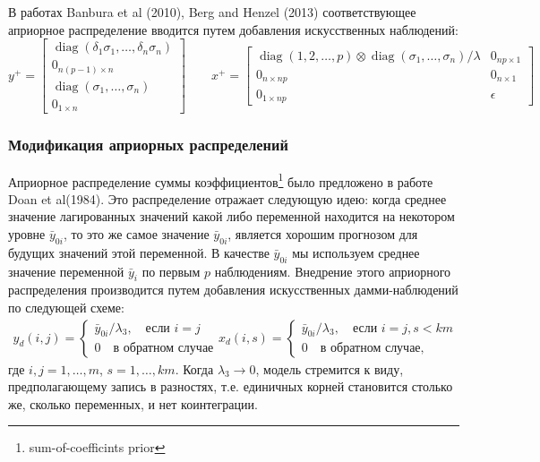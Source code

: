 \documentclass[11pt]{article} %
\DeclareMathOperator{\diag}{diag}
\begin{document}
В работах Banbura et al (2010), Berg and Henzel (2013) соответствующее априорное распределение вводится путем добавления искусственных наблюдений:
\begin{equation}
y^{+}=\begin{bmatrix}
\diag(\delta_1\sigma_1,\ldots, \delta_n\sigma_n)\\
0_{n(p-1)\times n}\\
\diag(\sigma_1,\ldots,\sigma_n)\\
0_{1\times n}
\end{bmatrix}
\qquad
%
x^{+}=\begin{bmatrix}
\diag(1,2,\ldots, p)\otimes \diag(\sigma_1,\ldots,\sigma_n)/\lambda & 0_{np\times 1} \\
0_{n\times np}&0_{n\times 1}\\
0_{1\times np}&\epsilon
\end{bmatrix}
\end{equation}


\subsubsection*{Модификация априорных распределений}

Априорное распределение суммы коэффициентов\footnote{sum-of-coefficints prior} было предложено в работе Doan et al(1984). Это распределение отражает следующую идею:
когда среднее значение лагированных значений какой либо переменной находится на некотором уровне $\bar y_{0i}$, то это же самое значение  $\bar y_{0i}$, является хорошим прогнозом  для будущих значений этой переменной. В качестве  $\bar y_{0i}$ мы используем среднее значение переменной  $\bar y_{i}$ по первым  $p$ наблюдениям. Внедрение этого априорного распределения производится путем добавления искусственных дамми-наблюдений по следующей схеме:
\begin{gather*}
y_d(i,j)=\begin{cases}
\bar y_{0i}/\lambda_3, \quad \text{если }i=j\\
0 \quad \text{в обратном случае}
\end{cases}
x_d(i,s)=\begin{cases}
\bar y_{0i}/\lambda_3,\quad \text{если }i=j, s<km\\
0 \quad \text{в обратном случае,}
\end{cases}
\end{gather*}
где $i,j=1,\ldots,m$, $s=1, \ldots, km$. Когда $\lambda_3\to 0$, модель стремится к виду, предполагающему запись в разностях, т.е. единичных корней становится столько же, сколько переменных, и нет коинтеграции.
\end{document}
